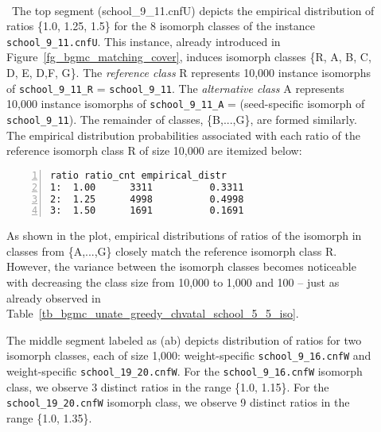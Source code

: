 
\begin{description}

\item[]~\\\
The top segment {\sf (school\_9\_11.cnfU)}
depicts  the empirical distribution of ratios \{1.0, 1.25, 1.5\}
for the 8 isomorph classes of the instance {\tt school\_9\_11.cnfU}.
This instance, %
already introduced in Figure~\ref{fg_bgmc_matching_cover},
induces isomorph classes \{{\sf R, A, B, C, D, E, D,F, G}\}.
The {\it reference class} {\sf R} represents 10,000 instance isomorphs of 
{\tt school\_9\_11\_R} = {\tt school\_9\_11}.
The {\it alternative class} {\sf A} represents 10,000 instance isomorphs of 
{\tt school\_9\_11\_A} = (seed-specific isomorph of {\tt school\_9\_11}).
The remainder of classes, \{B,...,G\}, are formed similarly.
%
The empirical distribution probabilities associated with each ratio
of the reference isomorph class {\sf R} of size 10,000 are itemized below:  
\par\vspace*{1.2ex}
\hspace*{1.6em}
\begin{minipage}{0.33\textwidth}
\begin{Verbatim}[frame=lines, fontsize=\footnotesize,numbers=left,
numbersep=3pt,firstline=1,xleftmargin=9mm] 
   ratio ratio_cnt empirical_distr
1:  1.00      3311          0.3311
2:  1.25      4998          0.4998
3:  1.50      1691          0.1691
\end{Verbatim}
\end{minipage}

\par\vspace*{1.2ex}\noindent
As shown in the plot, empirical distributions of ratios of the
isomorph in classes from  \{A,...,G\}
closely match the 
reference isomorph class {\sf R}.
However, the variance between the isomorph classes
becomes noticeable with decreasing the
class size from 10,000 to 1,000 and 100 
-- just as already observed in
Table~\ref{tb_bgmc_unate_greedy_chvatal_school_5_5_iso}.

The middle segment labeled as {\sf (ab)}
depicts  distribution of ratios  
for two isomorph classes, each of size 1,000:
weight-specific {\tt school\_9\_16.cnfW} and 
weight-specific {\tt school\_19\_20.cnfW}.
For  the {\tt school\_9\_16.cnfW} isomorph class, 
we observe 3 distinct ratios in the range  \{1.0, 1.15\}.
For the {\tt school\_19\_20.cnfW} isomorph class,
we observe  9 distinct ratios in the range  \{1.0, 1.35\}.


\end{description}

